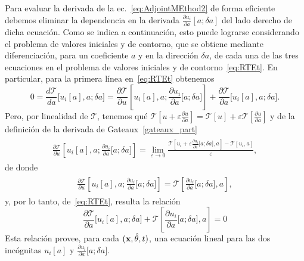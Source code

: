 Para evaluar la derivada de la ec.~\eqref{eq:AdjointMEthod2} de forma eficiente 
debemos eliminar la dependencia en la derivada $\frac{\partial u_i}{\partial a}[a;\delta a]$ 
del lado derecho de dicha ecuación. Como se indica a continuación, 
esto puede lograrse considerando el problema de valores iniciales 
y de contorno, que se obtiene mediante diferenciación, para un coeficiente 
$a$ y en la dirección $\delta a$, de cada una de las tres ecuaciones en 
el problema de valores iniciales y de contorno~\eqref{eq:RTEt}. 
En particular, para la primera línea en~\eqref{eq:RTEt} obtenemos
\begin{equation}
  0 = \frac{d\mathcal{T}}{da}\big[u_i[a],a;\delta a
  \big]=\frac{\partial \mathcal{T}}{\partial u}
  \left[u_i[a],a;\frac{\partial u_i}{\partial a}\big[a;\delta
    a\big]\right] + \frac{\partial \mathcal{T}}{\partial
    a}\big[u_i[a],a; \delta a \big].
\label{eq:RRTEder}
\end{equation}
Pero, por linealidad de $\mathcal{T}$, tenemos qué $\mathcal{T}[u+\varepsilon \frac{\partial u}{\partial a}]=\mathcal{T}[u]+\varepsilon\mathcal{T}[\frac{\partial u}{\partial a}]$ y 
de la definición de la derivada de Gateaux~\eqref{gateaux_part}
\begin{equation}
\begin{split}
\begin{aligned}
\frac{\partial \mathcal{T}}{\partial u}\left[u_i[a],a;\frac{\partial u_i}{\partial a}\big[a;\delta a\big]\right]= \lim_{\varepsilon \to 0} \frac{\mathcal{T}[u_i +\varepsilon\frac{\partial u_i}{\partial a}\big[a;\delta a\big],a]-\mathcal{T}[u_i,a]}{\varepsilon},
\end{aligned}
\end{split}
\label{eq:linealidadT}
\end{equation}
de donde
\begin{equation}
\begin{split}
\begin{aligned}
\frac{\partial \mathcal{T}}{\partial u}\left[u_i[a],a;\frac{\partial u_i}{\partial a}\big[a;\delta a\big]\right]=
\mathcal{T}\left[\frac{\partial u_i}{\partial a}\big[a;\delta a\big],a\right],
\end{aligned}
\end{split}
\label{eq:RRTEdet3}
\end{equation}
y, por lo tanto, de~\eqref{eq:RTEt}, resulta la relación
\begin{equation}
\frac{\partial \mathcal{T}}{\partial a}\big[u_i[a],a;\delta a\big] + 
\mathcal{T}\left[ \frac{\partial u_i}{\partial a}\big[a;\delta a\big],a \right]=0
\label{eq:RRTEdet4}
\end{equation}
Esta relación provee, para cada $(\mathbf{x},\hat{\theta},t)$, una ecuación 
lineal para las dos incógnitas $u_i[a]$ y 
$\frac{\partial u_i}{\partial a}\big[a;\delta a\big]$.

